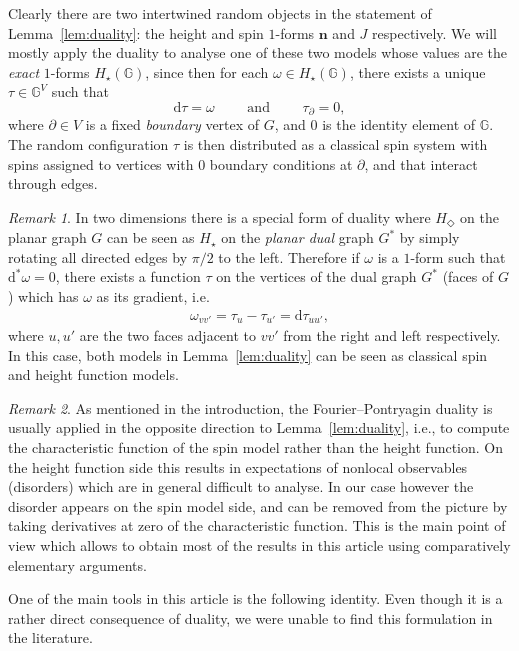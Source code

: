 \documentclass[11pt, reqno]{amsart}
\numberwithin{equation}{section}
\theoremstyle{definition}
\theoremstyle{remark}
\newtheorem{remark}{Remark}
\renewcommand{\d}{\mathrm{d}}
\newcommand{\n}{\mathbf{n}}
\newcommand{\exact}{\star}
\newcommand{\Hcycle}{\ensuremath{H_{\star}}}
\newcommand{\Hstar}{\ensuremath{H_{\Diamond}} }
\begin{document}
Clearly there are two intertwined random objects in the statement of Lemma~\ref{lem:duality}: the height and spin $1$-forms $\n$ and $J$ respectively. We will mostly apply the duality to analyse one of these two models
whose values are the \emph{exact} $1$-forms $H_\exact(\mathbb G)$, since then for each $\omega \in H_\exact(\mathbb G)$, there exists a unique $\tau \in \mathbb G^V$ such that
\[
\d\tau = \omega \qquad \text{ and } \qquad \tau_\partial =0,
\]
 where $\partial\in V$ is a fixed \emph{boundary} vertex of $G$, and $0$ is the identity element of $\mathbb G$. The random configuration $\tau$ is then distributed as a classical spin system with spins assigned to vertices with $0$ boundary conditions at $\partial$, and that interact through edges.


\begin{remark} 
In two dimensions there is a special form of duality where $\Hstar$ on the planar graph $G$ can be seen as $\Hcycle$ on the \emph{planar dual} graph $G^*$ by simply rotating all directed edges by $\pi/2$ to the left.
	Therefore if $\omega$ is a $1$-form such that $\d^*\omega = 0$, 
	there exists a function $\tau$ on the vertices of the {dual graph} $G^*$ (faces of $G$) which has $\omega$ as its gradient, i.e. 
	\begin{align*}
		\omega_{vv'} = \tau_u-\tau_{u'} = \d \tau_{uu'},
	\end{align*}
	where $u,u'$ are the two faces adjacent to $vv'$ from the right and left respectively. In this case, both models in Lemma~\ref{lem:duality} can be seen as classical spin and height function models.
\end{remark}


\begin{remark}
	As mentioned in the introduction, the Fourier--Pontryagin duality is usually applied in the opposite direction to Lemma~\ref{lem:duality}, i.e., to compute the characteristic function of the spin model rather than the height function. On the height function side this results in expectations of nonlocal observables (disorders) which are in general difficult to analyse.
	In our case however the disorder appears on the spin model side, and can be removed from the picture by taking derivatives at zero of the characteristic function.
	This is the main point of view which allows to obtain most of the results in this article using comparatively elementary arguments.
\end{remark}



One of the main tools in this article is the following identity. Even though it is a rather direct consequence of duality, we were unable to find this formulation in the literature.
\end{document}
